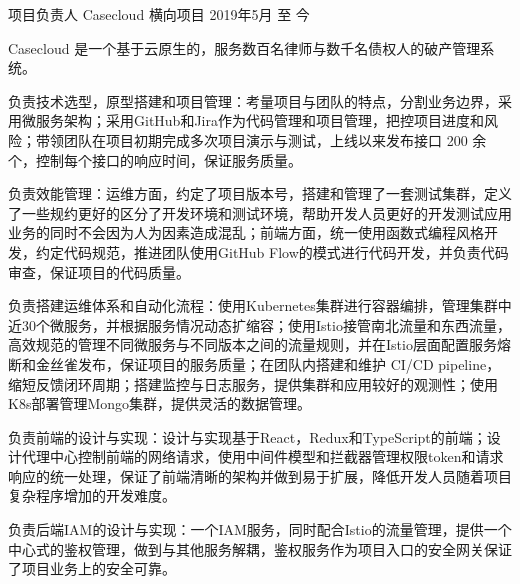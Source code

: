 

\begin{cventries}

  \cventry
    {项目负责人} %
    {Casecloud} %
    {横向项目} %
    {2019年5月 至 今} %
    {
      \begin{cvitems} %
        \setlength\itemsep{1mm}
        \item {Casecloud 是一个基于云原生的，服务数百名律师与数千名债权人的破产管理系统。}
        \item {负责技术选型，原型搭建和项目管理：考量项目与团队的特点，分割业务边界，采用微服务架构；采用GitHub和Jira作为代码管理和项目管理，把控项目进度和风险；带领团队在项目初期完成多次项目演示与测试，上线以来发布接口 200 余个，控制每个接口的响应时间，保证服务质量。}
        \item {负责效能管理：运维方面，约定了项目版本号，搭建和管理了一套测试集群，定义了一些规约更好的区分了开发环境和测试环境，帮助开发人员更好的开发测试应用业务的同时不会因为人为因素造成混乱；前端方面，统一使用函数式编程风格开发，约定代码规范，推进团队使用GitHub Flow的模式进行代码开发，并负责代码审查，保证项目的代码质量。}
        \item {负责搭建运维体系和自动化流程：使用Kubernetes集群进行容器编排，管理集群中近30个微服务，并根据服务情况动态扩缩容；使用Istio接管南北流量和东西流量，高效规范的管理不同微服务与不同版本之间的流量规则，并在Istio层面配置服务熔断和金丝雀发布，保证项目的服务质量；在团队内搭建和维护 CI/CD pipeline，缩短反馈闭环周期；搭建监控与日志服务，提供集群和应用较好的观测性；使用K8s部署管理Mongo集群，提供灵活的数据管理。}
        \item {负责前端的设计与实现：设计与实现基于React，Redux和TypeScript的前端；设计代理中心控制前端的网络请求，使用中间件模型和拦截器管理权限token和请求响应的统一处理，保证了前端清晰的架构并做到易于扩展，降低开发人员随着项目复杂程序增加的开发难度。}
        \item {负责后端IAM的设计与实现：一个IAM服务，同时配合Istio的流量管理，提供一个中心式的鉴权管理，做到与其他服务解耦，鉴权服务作为项目入口的安全网关保证了项目业务上的安全可靠。}
      \end{cvitems}
    }


\end{cventries}
